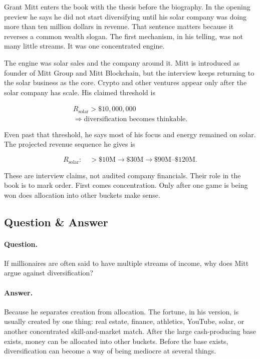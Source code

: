 \documentclass[11pt,oneside]{book}
\begin{document}
Grant Mitt enters the book with the thesis before the biography. In the opening preview he says he did not start diversifying until his solar company was doing more than ten million dollars in revenue. That sentence matters because it reverses a common wealth slogan. The first mechanism, in his telling, was not many little streams. It was one concentrated engine.

The engine was solar sales and the company around it. Mitt is introduced as founder of Mitt Group and Mitt Blockchain, but the interview keeps returning to the solar business as the core. Crypto and other ventures appear only after the solar company has scale. His claimed threshold is

\begin{equation}
\begin{gathered}
R_{\mathrm{solar}}>\$10{,}000{,}000\\
\Longrightarrow\text{diversification becomes thinkable}.
\end{gathered}
\end{equation}

Even past that threshold, he says most of his focus and energy remained on solar. The projected revenue sequence he gives is

\begin{equation}
R_{\mathrm{solar}}:\quad
>\$10\mathrm{M}\rightarrow \$30\mathrm{M}\rightarrow \$90\mathrm{M}\text{--}\$120\mathrm{M}.
\end{equation}

These are interview claims, not audited company financials. Their role in the book is to mark order. First comes concentration. Only after one game is being won does allocation into other buckets make sense.

\subsection{Question \& Answer}

\paragraph{Question.}
If millionaires are often said to have multiple streams of income, why does Mitt argue against diversification?

\paragraph{Answer.}
Because he separates creation from allocation. The fortune, in his version, is usually created by one thing: real estate, finance, athletics, YouTube, solar, or another concentrated skill-and-market match. After the large cash-producing base exists, money can be allocated into other buckets. Before the base exists, diversification can become a way of being mediocre at several things.
\end{document}
